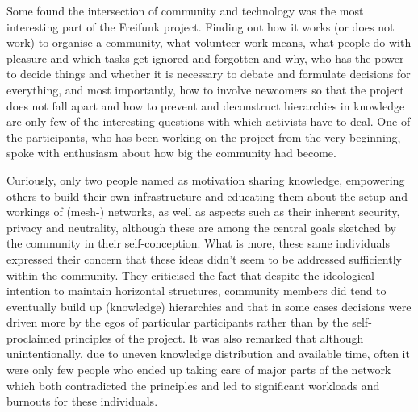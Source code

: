 Some found the intersection of community and technology was the most interesting part of the Freifunk project.
Finding out how it works (or does not work) to organise a community, what volunteer work means, what people do with pleasure and which tasks get ignored and forgotten and why, who has the power to decide things and whether it is necessary to debate and formulate decisions for everything, and most importantly, how to involve newcomers so that the project does not fall apart and how to prevent and deconstruct hierarchies in knowledge are only few of the interesting questions with which activists have to deal.
One of the participants, who has been working on the project from the very beginning, spoke with enthusiasm about how big the community had become.

Curiously, only two people named as motivation sharing knowledge, empowering others to build their own infrastructure and educating them about the setup and workings of (mesh-) networks, as well as aspects such as their inherent security, privacy and neutrality, although these are among the central goals sketched by the community in their self-conception\cite{ffweb}.
What is more, these same individuals expressed their concern that these ideas didn't seem to be addressed sufficiently within the community.
They criticised the fact that despite the ideological intention to maintain horizontal structures, community members did tend to eventually build up (knowledge) hierarchies and that in some cases decisions were driven more by the egos of particular participants rather than by the self-proclaimed principles of the project.
It was also remarked that although unintentionally, due to uneven knowledge distribution and available time, often it were only few people who ended up taking care of major parts of the network which both contradicted the principles and led to significant workloads and burnouts for these individuals.

\begin{comment}
Many of the interviewed only started to actively participate in Freifunk after attending some kind of event: be it a local community meeting, meeting activists at the Chaos Communication Congress or other kinds of conferences.
\end{comment}

